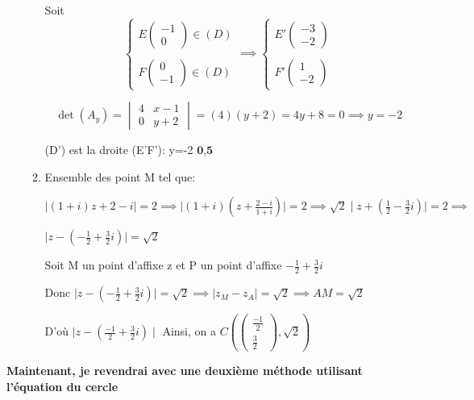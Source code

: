 \documentclass[12pt]{article}
\begin{document}
\begin{enumerate}
\begin{enumerate}
Soit  
\[
\begin{cases}
E\begin{pmatrix} -1 \\ 
0\end{pmatrix}\in (D)\\ \\
F\begin{pmatrix} 0 \\ -1\end{pmatrix}\in (D)
\end{cases} \implies 
\begin{cases}
E'\begin{pmatrix} -3 \\ -2\end{pmatrix}\\ \\
F'\begin{pmatrix} 1 \\ -2\end{pmatrix}
\end{cases}
\]

\[
\det(A_y) = \begin{vmatrix}
4 & x-1 \\
0 & y+2
\end{vmatrix} = (4)(y+2) = 4y+8=0\implies y=-2
\]	

(D') est la droite (E'F'): y=-2 $\textbf{0,5}$


\item Ensemble des point M tel que:

$\mid (1+i)z+2-i\mid=2 \implies \mid (1+i)\left( z+\frac{2-i}{1+i}\right) \mid=2 \implies \sqrt{2}\mid z+\left( \frac{1}{2}-\frac{3}{2}i\right) \mid=2 \implies $

$\mid z-\left( -\frac{1}{2}+\frac{3}{2}i\right) \mid=\sqrt{2}$

Soit M un point d'affixe z et P un point d'affixe $-\frac{1}{2}+\frac{3}{2}i$

Donc $ \mid z-\left( -\frac{1}{2}+\frac{3}{2}i\right) \mid=\sqrt{2} \implies \mid z_{M}- z_{A} \mid=\sqrt{2} \implies AM=\sqrt{2}$


D'où $\mid z-(\frac{-1}{2}+\frac{3}{2}i)\mid$ Ainsi, on a $ C\left( \begin{pmatrix} \frac{-1}{2} \\ \frac{3}{2}\end{pmatrix}, \sqrt{2}\right) $
\end{enumerate}
\end{enumerate}

\textbf{Maintenant, je revendrai avec une deuxième méthode utilisant l'équation du cercle}
\end{document}
